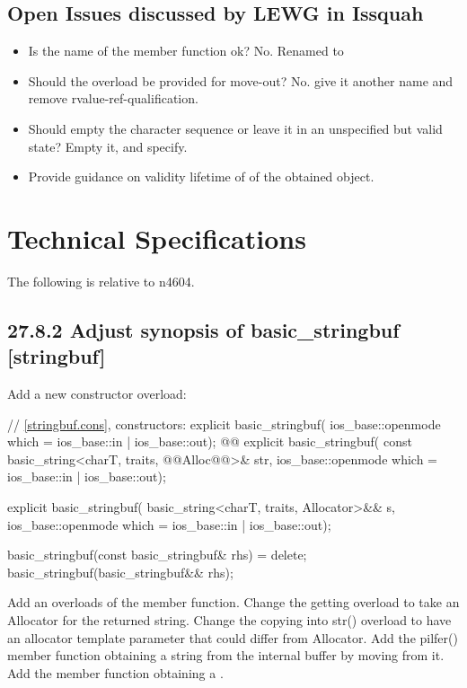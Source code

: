 \documentclass[ebook,11pt,article]{memoir}
\begin{document}
\section{Open Issues discussed by LEWG in Issquah}
\begin{itemize}
\item Is the name of the  member function ok? No. Renamed to 
\item Should the  overload be provided for move-out? No. give it another name and remove rvalue-ref-qualification.
\item Should  empty the character sequence or leave it in an unspecified but valid state? Empty it, and specify.
\item Provide guidance on validity lifetime of of the obtained  object.
\end{itemize}

\chapter{Technical Specifications}
The following is relative to n4604.
\section{27.8.2 Adjust synopsis of basic\_stringbuf [stringbuf]}
Add a new constructor overload:
\begin{codeblock}
    // \ref{stringbuf.cons}, constructors:
    explicit basic_stringbuf(
      ios_base::openmode which = ios_base::in | ios_base::out);
    @@
    explicit basic_stringbuf(
      const basic_string<charT, traits, @@Alloc@@>& str,
      ios_base::openmode which = ios_base::in | ios_base::out);
\end{codeblock}
\begin{addedblock}\begin{codeblock}
    explicit basic_stringbuf(
      basic_string<charT, traits, Allocator>&& s,
      ios_base::openmode which = ios_base::in | ios_base::out);
\end{codeblock}\end{addedblock}
\begin{codeblock}
    basic_stringbuf(const basic_stringbuf& rhs) = delete;
    basic_stringbuf(basic_stringbuf&& rhs);
\end{codeblock}

Add an overloads of the  member function. Change the getting  overload to take an Allocator for the returned string. Change the copying into str() overload to have an allocator template parameter that could differ from Allocator. Add the pilfer() member function obtaining a string from the internal buffer by moving from it. Add the  member function obtaining a .
\end{document}
